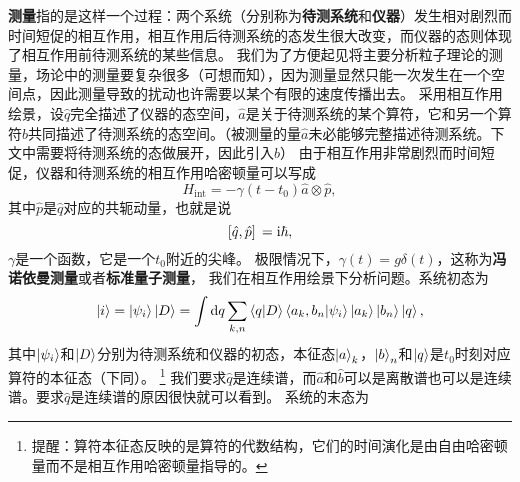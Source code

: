 \documentclass[UTF8, a4paper]{ctexart}
\newcommand*{\ii}{\mathrm{i}}
\begin{document}
\textbf{测量}指的是这样一个过程：两个系统（分别称为\textbf{待测系统}和\textbf{仪器}）发生相对剧烈而时间短促的相互作用，相互作用后待测系统的态发生很大改变，而仪器的态则体现了相互作用前待测系统的某些信息。
我们为了方便起见将主要分析粒子理论的测量，场论中的测量要复杂很多（可想而知），因为测量显然只能一次发生在一个空间点，因此测量导致的扰动也许需要以某个有限的速度传播出去。
采用相互作用绘景，设$\hat{q}$完全描述了仪器的态空间，$\hat{a}$是关于待测系统的某个算符，它和另一个算符$\hat{b}$共同描述了待测系统的态空间。（被测量的量$\hat{a}$未必能够完整描述待测系统。下文中需要将待测系统的态做展开，因此引入$\hat{b}$）
由于相互作用非常剧烈而时间短促，仪器和待测系统的相互作用哈密顿量可以写成
\begin{equation}
    H_\text{int} = - \gamma(t-t_0) \hat{a} \otimes \hat{p},
\end{equation}
其中$\hat{p}$是$\hat{q}$对应的共轭动量，也就是说
\[
    \comm*{\hat{q}}{\hat{p}} = \ii \hbar,
\]
$\gamma$是一个函数，它是一个$t_0$附近的尖峰。
极限情况下，$\gamma(t) = g \delta(t)$，这称为\textbf{冯诺依曼测量}或者\textbf{标准量子测量}，
我们在相互作用绘景下分析问题。系统初态为
\[
    \ket{i} = \ket{\psi_i} \ket{D} = \int \dd{q} \sum_{k, n} \braket{q}{D} \braket{a_k, b_n}{\psi_i} \ket{a_k} \ket{b_n} \ket{q},
\]
其中$\ket{\psi_i}$和$\ket{D}$分别为待测系统和仪器的初态，本征态$\ket{a}_k$，$\ket{b}_n$和$\ket{q}$是$t_0$时刻对应算符的本征态（下同）。%
\footnote{提醒：算符本征态反映的是算符的代数结构，它们的时间演化是由自由哈密顿量而不是相互作用哈密顿量指导的。}%
我们要求$\hat{q}$是连续谱，而$\hat{a}$和$\hat{b}$可以是离散谱也可以是连续谱。要求$\hat{q}$是连续谱的原因很快就可以看到。
系统的末态为
\end{document}
